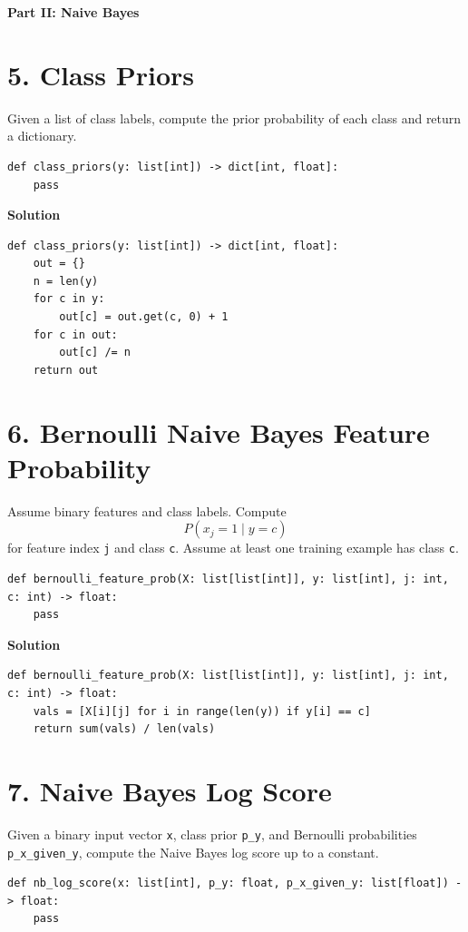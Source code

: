 \documentclass[11pt]{article}
\begin{document}
\vspace{0.75em}
\noindent\textbf{\large Part II: Naive Bayes}
\vspace{0.5em}

\section*{5. Class Priors}
Given a list of class labels, compute the prior probability of each class and return a dictionary.

\begin{lstlisting}
def class_priors(y: list[int]) -> dict[int, float]:
    pass
\end{lstlisting}

\medskip
\noindent\textbf{Solution}
\begin{lstlisting}
def class_priors(y: list[int]) -> dict[int, float]:
    out = {}
    n = len(y)
    for c in y:
        out[c] = out.get(c, 0) + 1
    for c in out:
        out[c] /= n
    return out
\end{lstlisting}

\section*{6. Bernoulli Naive Bayes Feature Probability}
Assume binary features and class labels. Compute
\[
P(x_j = 1 \mid y = c)
\]
for feature index \texttt{j} and class \texttt{c}. Assume at least one training example has class \texttt{c}.

\begin{lstlisting}
def bernoulli_feature_prob(X: list[list[int]], y: list[int], j: int, c: int) -> float:
    pass
\end{lstlisting}

\medskip
\noindent\textbf{Solution}
\begin{lstlisting}
def bernoulli_feature_prob(X: list[list[int]], y: list[int], j: int, c: int) -> float:
    vals = [X[i][j] for i in range(len(y)) if y[i] == c]
    return sum(vals) / len(vals)
\end{lstlisting}

\section*{7. Naive Bayes Log Score}
Given a binary input vector \texttt{x}, class prior \texttt{p\_y}, and Bernoulli probabilities \texttt{p\_x\_given\_y}, compute the Naive Bayes log score up to a constant.

\begin{lstlisting}
def nb_log_score(x: list[int], p_y: float, p_x_given_y: list[float]) -> float:
    pass
\end{lstlisting}
\end{document}
